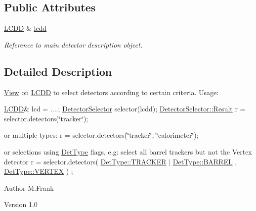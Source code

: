 \subsection*{Public Attributes}
\begin{DoxyCompactItemize}
\item 
\hyperlink{class_d_d4hep_1_1_geometry_1_1_l_c_d_d}{LCDD} \& \hyperlink{class_d_d4hep_1_1_geometry_1_1_detector_selector_a6091743fea97ad21aa2bca9e5da2d3d0}{lcdd}
\begin{DoxyCompactList}\small\item\em Reference to main detector description object. \item\end{DoxyCompactList}\end{DoxyCompactItemize}


\subsection{Detailed Description}
\hyperlink{class_d_d4hep_1_1_view}{View} on \hyperlink{class_d_d4hep_1_1_geometry_1_1_l_c_d_d}{LCDD} to select detectors according to certain criteria. Usage:

\hyperlink{class_d_d4hep_1_1_geometry_1_1_l_c_d_d}{LCDD}\& lcd = ....; \hyperlink{class_d_d4hep_1_1_geometry_1_1_detector_selector}{DetectorSelector} selector(lcdd); \hyperlink{class_d_d4hep_1_1_geometry_1_1_detector_selector_a6ce0dfe8c83f5d36138244218f260ed1}{DetectorSelector::Result} r = selector.detectors(\char`\"{}tracker\char`\"{});

or multiple types: r = selector.detectors(\char`\"{}tracker\char`\"{}, \char`\"{}calorimeter\char`\"{});

or selections using \hyperlink{class_d_d4hep_1_1_det_type}{DetType} flags, e.g: select all barrel trackers but not the Vertex detector r = selector.detectors( \hyperlink{class_d_d4hep_1_1_det_type_aca757d7a9b865d1fb8f7997eb5c0a72cae974ecec59fd2a2900db7e5f44cd0884}{DetType::TRACKER} $|$ \hyperlink{class_d_d4hep_1_1_det_type_aca757d7a9b865d1fb8f7997eb5c0a72caaca38656f429ac259f2aeb2a22359c1e}{DetType::BARREL} , \hyperlink{class_d_d4hep_1_1_det_type_aca757d7a9b865d1fb8f7997eb5c0a72cadd4fea08e228d05a34ba2e613697d85e}{DetType::VERTEX} ) ;

\begin{DoxyAuthor}{Author}
M.Frank 
\end{DoxyAuthor}
\begin{DoxyVersion}{Version}
1.0 
\end{DoxyVersion}


